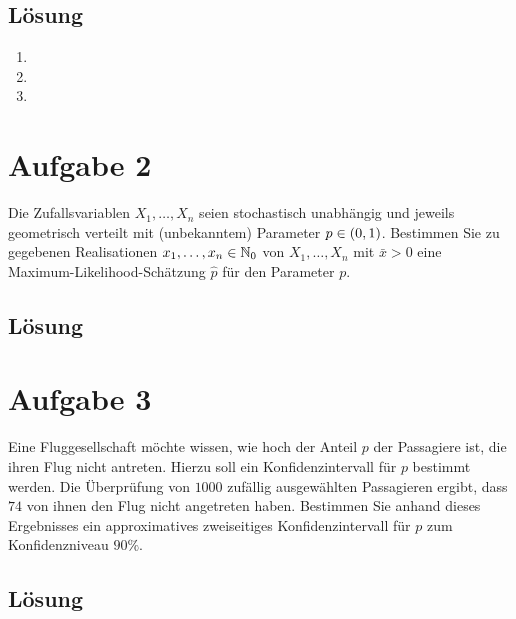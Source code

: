 \documentclass{exercise}
\begin{document}
    \subsection*{Lösung}
    \begin{enumerate}
        \item
        \item
        \item
    \end{enumerate}
    
    
    \section*{Aufgabe 2}
    
    \begin{problem}
        Die Zufallsvariablen \(X_1, \ldots, X_n\) seien stochastisch unabhängig und jeweils geometrisch verteilt mit (unbekanntem) Parameter \(p \in \parentheses*{0, 1}\).
        Bestimmen Sie zu gegebenen Realisationen \(x_1, \ldots, x_n \in \N_0\) von \(X_1, \ldots, X_n\) mit \(\bar{x} > 0\) eine Maximum-Likelihood-Schätzung \(\hat{p}\) für den Parameter \(p\).
    \end{problem}
    
    \subsection*{Lösung}
    
    
    \section*{Aufgabe 3}
    
    \begin{problem}
        Eine Fluggesellschaft möchte wissen, wie hoch der Anteil \(p\) der Passagiere ist, die ihren Flug nicht antreten.
        Hierzu soll ein Konfidenzintervall für \(p\) bestimmt werden.
        Die Überprüfung von \(1000\) zufällig ausgewählten Passagieren ergibt, dass \(74\) von ihnen den Flug nicht angetreten haben.
        Bestimmen Sie anhand dieses Ergebnisses ein approximatives zweiseitiges Konfidenzintervall für \(p\) zum Konfidenzniveau \(90\%\).
    \end{problem}
    
    \subsection*{Lösung}
\end{document}
